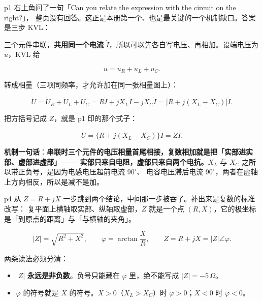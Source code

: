 \documentclass[11pt]{ctexart}
\begin{document}

p1 右上角问了一句「Can you relate the expression with the circuit on the right?」，
整页没有回答。这正是本册第一个、也是最关键的一个机制缺口。答案是三步 KVL：

三个元件串联，\textbf{共用同一个电流} $\dot I$，所以可以先各自写电压、再相加。设端电压为 $u$，KVL 给

\[ u=u_R+u_L+u_C . \]

转成相量（三项同频率，才允许加在同一张相量图上）：

\[ \dot U=\dot U_R+\dot U_L+\dot U_C
   =R\dot I+jX_L\dot I-jX_C\dot I
   =\bigl[R+j(X_L-X_C)\bigr]\dot I . \]

把方括号记成 $Z$，就是 p1 印的那个式子：

\[ \dot U=\bigl\{R+j(X_L-X_C)\bigr\}\dot I=Z\dot I . \]

\textbf{机制一句话}：\textbf{串联时三个元件的电压相量首尾相接，复数相加就是把「实部进实部、虚部进虚部」——
实部只来自电阻，虚部只来自两个电抗。}$X_L$ 与 $X_C$ 之所以带正负号，是因为电感电压超前电流 $90^\circ$、
电容电压滞后电流 $90^\circ$，两者在虚轴上方向相反，所以是减不是加。



p4 从 $Z=R+jX$ 一步跳到两个结论，中间那一步被吞了。补出来是复数的标准改写：
复平面上横轴取实部、纵轴取虚部，$Z$ 就是一个点 $(R,X)$，它的极坐标是「到原点的距离」与「与横轴的夹角」。

\[ |Z|=\sqrt{R^{2}+X^{2}} ,\qquad \varphi=\arctan\frac{X}{R} ,\qquad Z=R+jX=|Z|\angle\varphi . \]

两条读法必须分清：

\begin{itemize}
\item $|Z|$ \textbf{永远是非负数}。负号只能藏在 $\varphi$ 里，绝不能写成 $|Z|=-5\,\Omega$。
\item $\varphi$ 的符号就是 $X$ 的符号。$X>0$（$X_L>X_C$）时 $\varphi>0$；$X<0$ 时 $\varphi<0$。
\end{itemize}

\end{document}

